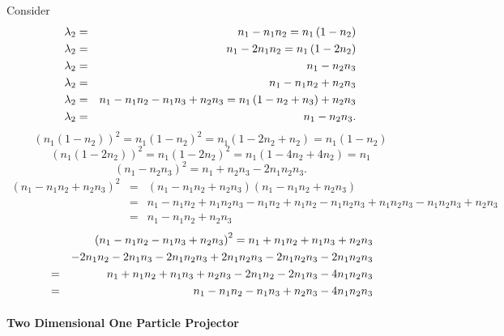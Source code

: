 \documentclass[12pt]{article}
\begin{document}
Consider%
\begin{eqnarray}
\lambda _{2} &=&n_{1}-n_{1}n_{2}=n_{1}\left( 1-n_{2}\right)  \notag \\
\lambda _{2} &=&n_{1}-2n_{1}n_{2}=n_{1}\left( 1-2n_{2}\right)  \notag \\
\lambda _{2} &=&n_{1}-n_{2}n_{3} \\
\lambda _{2} &=&n_{1}-n_{1}n_{2}+n_{2}n_{3}  \notag \\
\lambda _{2} &=&n_{1}-n_{1}n_{2}-n_{1}n_{3}+n_{2}n_{3}=n_{1}\left(
1-n_{2}+n_{3}\right) +n_{2}n_{3}  \notag \\
\lambda _{2} &=&n_{1}-n_{2}n_{3}.
\end{eqnarray}%
\begin{equation}
\left( n_{1}\left( 1-n_{2}\right) \right) ^{2}=n_{1}\left( 1-n_{2}\right)
^{2}=n_{1}\left( 1-2n_{2}+n_{2}\right) =n_{1}\left( 1-n_{2}\right)
\end{equation}%
\begin{equation}
\left( n_{1}\left( 1-2n_{2}\right) \right) ^{2}=n_{1}\left( 1-2n_{2}\right)
^{2}=n_{1}\left( 1-4n_{2}+4n_{2}\right) =n_{1}
\end{equation}%
\begin{equation}
\left( n_{1}-n_{2}n_{3}\right) ^{2}=n_{1}+n_{2}n_{3}-2n_{1}n_{2}n_{3}.
\end{equation}%
\begin{eqnarray}
\left( n_{1}-n_{1}n_{2}+n_{2}n_{3}\right) ^{2} &=&\left(
n_{1}-n_{1}n_{2}+n_{2}n_{3}\right) \left( n_{1}-n_{1}n_{2}+n_{2}n_{3}\right)
\\
&=&n_{1}-n_{1}n_{2}+n_{1}n_{2}n_{3}-n_{1}n_{2}+n_{1}n_{2}-n_{1}n_{2}n_{3}+n_{1}n_{2}n_{3}-n_{1}n_{2}n_{3}+n_{2}n_{3}
\\
&=&n_{1}-n_{1}n_{2}+n_{2}n_{3}
\end{eqnarray}%
\begin{eqnarray}
&&\left( n_{1}-n_{1}n_{2}-n_{1}n_{3}+n_{2}n_{3}\right)
^{2}=n_{1}+n_{1}n_{2}+n_{1}n_{3}+n_{2}n_{3}  \notag \\
&&-2n_{1}n_{2}-2n_{1}n_{3}-2n_{1}n_{2}n_{3}+2n_{1}n_{2}n_{3}-2n_{1}n_{2}n_{3}-2n_{1}n_{2}n_{3}
\notag \\
&=&n_{1}+n_{1}n_{2}+n_{1}n_{3}+n_{2}n_{3}-2n_{1}n_{2}-2n_{1}n_{3}-4n_{1}n_{2}n_{3}
\notag \\
&=&n_{1}-n_{1}n_{2}-n_{1}n_{3}+n_{2}n_{3}-4n_{1}n_{2}n_{3}
\end{eqnarray}

\paragraph{Two Dimensional One Particle Projector}
\end{document}
